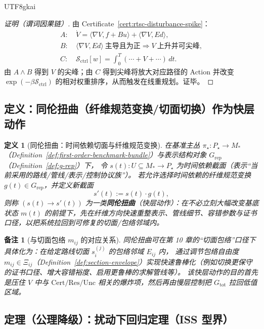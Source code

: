 \documentclass[12pt]{article}
\newtheorem{definition}{定义}[section]
\newtheorem{remark}{备注}[section]
\begin{document}
\begin{CJK*}{UTF8}{gkai}
\begin{proof}[证明（谓词因果链）]
由 Certificate~\ref{cert:rtsc-disturbance-spike}：
\[
\begin{aligned}
A:&\ \dot V=\langle\nabla V,f+Bu\rangle+\langle\nabla V,Ed\rangle,\\
B:&\ \langle\nabla V,Ed\rangle\ \text{主导且为正}\Rightarrow V\ \text{上升并可尖峰},\\
C:&\ \mathcal{S}_{\mathrm{ctrl}}[w]=\int_0^T(\cdots+V+\cdots)\,dt.
\end{aligned}
\]
由 $A\wedge B$ 得到 $V$ 的尖峰；由 $C$ 得到尖峰将放大对应路径的 Action 并改变 $\exp(-\beta\mathcal{S}_{\mathrm{ctrl}})$ 的相对权重排序，从而触发在线重规划。证毕。
\end{proof}

\subsection{定义：同伦扭曲（纤维规范变换/切面切换）作为快层动作}

\begin{definition}[同伦扭曲：时间依赖切面与纤维规范变换]
\label{def:rtsc-homotopy-twist}
在基准主丛 $\pi_\star:P_\star\to M_\ast$（Definition~\ref{def:first-order-benchmark-bundle}）与表示结构对象 $G_{\mathrm{rep}}
  $（Definition~\ref{def:g-rep}）下，
令 $s(t):U\subseteq M_\ast\to P_\star$ 为时间依赖截面（表示“当前采用的路线/管线/表示/控制协议族”）。
若允许选择时间依赖的纤维规范变换 $g(t)\in G_{\mathrm{rep}}$，并定义新截面
\[
s'(t):=s(t)\cdot g(t),
\]
则称 $(s(t)\to s'(t))$ 为一类\textbf{同伦扭曲}（快层动作）：在不必立刻大幅改变基底状态 $m(t)$ 的前提下，先在纤维方向快速重整表示、管线细节、容错参数与证书口径，以把系统拉回到可修复的切面/包络邻域内。
\end{definition}

\begin{remark}[与切面包络 $m_{ij}$ 的对应关系]
同伦扭曲可在第 10 章的“切面包络”口径下具体化为：在给定路线切面 $s_i^{(j)}$ 的包络邻域 $E_{ij}$ 内，
通过调节包络自由度 $m_{ij}\in \Xi_{ij}$（Definition~\ref{def:section-envelope}）实现快速鲁棒化（例如切换更保守的证书口径、增大容错裕度、启用更鲁棒的求解管线等）。
该快层动作的目的首先是压住 $V$ 中与 $\mathrm{Cert}/\mathrm{Res}/\mathrm{Unc}$ 相关的爆炸项，然后再由慢层控制把 $G_{\mathrm{tot}}$ 拉回低值区域。
\end{remark}

\subsection{定理（公理降级）：扰动下回归定理（ISS 型界）}


\end{CJK*}
\end{document}
